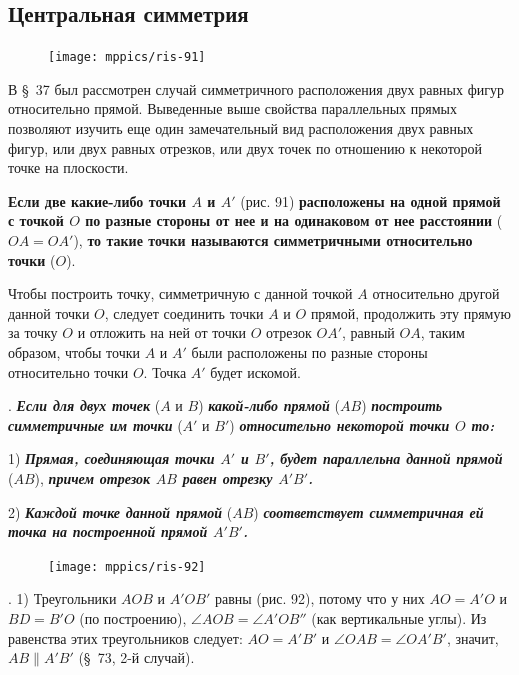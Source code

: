 \documentclass[oneside]{book}
\begin{document}
\subsection*{Центральная симметрия}

\begin{figure}
\centering
\texttt{[image: mppics/ris-91]}
\caption{}
\end{figure}

В §~37 был рассмотрен случай симметричного расположения двух равных фигур относительно прямой.
Выведенные выше свойства параллельных прямых позволяют изучить еще один замечательный вид расположения двух равных фигур, или двух равных отрезков, или двух точек по отношению к некоторой точке на плоскости.

\textbf{Если две какие-либо точки $A$ и $A'$} (рис. 91) \textbf{расположены на одной прямой с точкой $O$ по разные стороны от нее и на одинаковом от нее расстоянии} ($OA=OA'$), \textbf{то такие точки называются симметричными относительно точки} ($O$).

Чтобы построить точку, симметричную с данной точкой $A$ относительно другой данной точки $O$, следует соединить точки $A$ и $O$ прямой, продолжить эту прямую за точку $O$ и отложить на ней от точки $O$ отрезок $OA'$, равный $OA$, таким образом, чтобы точки $A$ и $A'$ были расположены по разные стороны относительно точки $O$.
Точка $A'$ будет искомой.

.
\textbf{\emph{Если для двух точек}} ($A$ и $B$) \textbf{\emph{какой-либо прямой}} ($AB$) \textbf{\emph{построить симметричные им точки}} ($A'$ и $B'$) \textbf{\emph{относительно некоторой точки $O$ то:}}

1) \textbf{\emph{Прямая, соединяющая точки $A'$ и $B'$, будет параллельна данной прямой}} ($AB$), \textbf{\emph{причем отрезок $AB$ равен отрезку $A'B'$.}}

2) \textbf{\emph{Каждой точке данной прямой}} ($AB$) \textbf{\emph{соответствует симметричная ей точка на построенной прямой $A'B'$.}}

\begin{figure}
\centering
\texttt{[image: mppics/ris-92]}
\caption{}
\end{figure}

\mbox{.}
1) Треугольники $AOB$ и $A'OB'$ равны (рис. 92), потому что у них $AO=A'O$ и $BD=B'O$ (по построению), $\angle AOB=\angle A'OB''$ (как вертикальные углы).
Из равенства этих треугольников следует:
$AO=A'B'$ и $\angle OAB = \angle OA'B'$, значит, $AB\parallel A'B'$ (§~73, 2-й случай).
\end{document}
